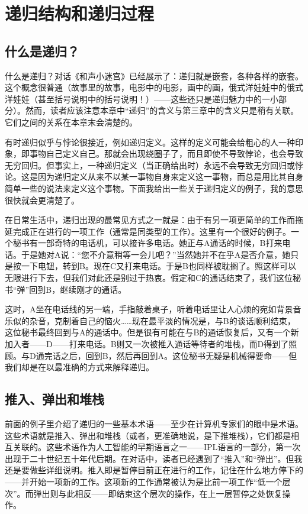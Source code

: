 
\chapter{递归结构和递归过程}

\section{什么是递归？}

什么是递归？对话《和声小迷宫》已经展示了：递归就是嵌套，各种各样的嵌套。这个概念很普通（故事里的故事，电影中的电影，画中的画，俄式洋娃娃中的俄式洋娃娃（甚至括号说明中的括号说明！）——这些还只是递归魅力中的一小部分）。然而，读者应该注意本章中“递归”的含义与第三章中的含义只是稍有关联。它们之间的关系在本章末会清楚的。

有时递归似乎与悖论很接近，例如递归定义。这样的定义可能会给粗心的人一种印象，即事物自己定义自己。那就会出现绕圈子了，而且即使不导致悖论，也会导致无穷回归。但事实上，一种递归定义（当正确给出时）永远不会导致无穷回归或悖论。这是因为递归定义从来不以某一事物自身来定义这一事物，而总是用比其自身简单一些的说法来定义这个事物。下面我给出一些关于递归定义的例子，我的意思很快就会更清楚了。

在日常生活中，递归出现的最常见方式之一就是：由于有另一项更简单的工作而拖延完成正在进行的一项工作（通常是同类型的工作）。这里有一个很好的例子。一个秘书有一部奇特的电话机，可以接许多电话。她正与A通话的时候，B打来电话。于是她对A说：“您不介意稍等一会儿吧？”当然她并不在乎A是否介意，她只是按一下电钮，转到B。现在C又打来电话。于是B也同样被耽搁了。照这样可以无限进行下去，但我们对此还是别过于热衷。假定和C的通话结束了，我们这位秘书“弹”回到B，继续刚才的通话。

这时，A坐在电话线的另一端，手指敲着桌子，听着电话里让人心烦的宛如背景音乐似的杂音，克制着自己的恼火……现在最平淡的情况是，与B的谈话顺利结束，这位秘书最终回到与A的通话中。但是很有可能在与B的通话恢复后，又有一个新加入者——D——打来电话。B则又一次被推入通话等待者的堆栈，而D得到了照顾。与D通完话之后，回到B，然后再回到A。这位秘书无疑是机械得要命——但我们却是在以最准确的方式来解释递归。

\section{推入、弹出和堆栈}

前面的例子里介绍了递归的一些基本术语——至少在计算机专家们的眼中是术语。这些术语就是推入、弹出和堆栈（或者，更准确地说，是下推堆栈），它们都是相互关联的。这些术语作为人工智能的早期语言之一——IPL语言的一部分，第一次出现于二十世纪五十年代后期。在对话中，读者已经遇到了“推入”和“弹出”。但我还是要做些详细说明。推入即是暂停目前正在进行的工作，记住在什么地方停下的——并开始一项新的工作。这项新的工作通常被认为是比前一项工作“低一个层次”。而弹出则与此相反——即结束这个层次的操作，在上一层暂停之处恢复操作。

